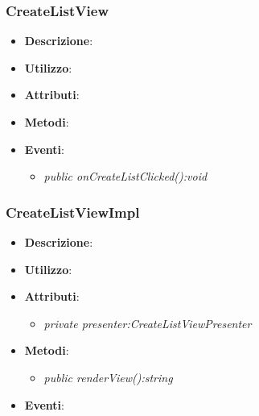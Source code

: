\subsubsection{CreateListView}
\begin{itemize}
\item \textbf{Descrizione}: 
\item \textbf{Utilizzo}:
\item \textbf{Attributi}: 
\item \textbf{Metodi}:
\item \textbf{Eventi}:
	\begin{itemize}
	\item \textit{public onCreateListClicked():void}\\

	\end{itemize}
\end{itemize}

\subsubsection{CreateListViewImpl}
\begin{itemize}
\item \textbf{Descrizione}: 
\item \textbf{Utilizzo}:
\item \textbf{Attributi}: 
	\begin{itemize}
	\item \textit{private presenter:CreateListViewPresenter}\\
	
	\end{itemize}
\item \textbf{Metodi}:
	\begin{itemize}
	\item \textit{public renderView():string}\\

	\end{itemize}
\item \textbf{Eventi}:
\end{itemize}

